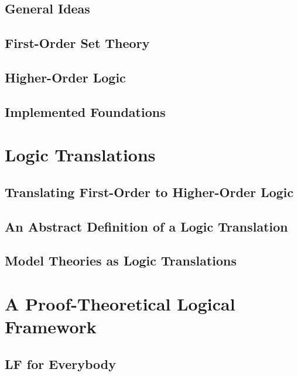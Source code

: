 \documentclass{book}
\begin{document}
\chapter{General Ideas}
  

\chapter{First-Order Set Theory}
  
  
\chapter{Higher-Order Logic}
  

\chapter{Implemented Foundations}
  

\part{Logic Translations}\label{sec:trans}

\chapter{Translating First-Order to Higher-Order Logic}\label{sec:folhol}
  

\chapter{An Abstract Definition of a Logic Translation}\label{sec:trans:abs}
  
  
\chapter{Model Theories as Logic Translations}
  

\part{A Proof-Theoretical Logical Framework}\label{part:lf}

\chapter{LF for Everybody}\label{sec:lffe}
 
\end{document}
